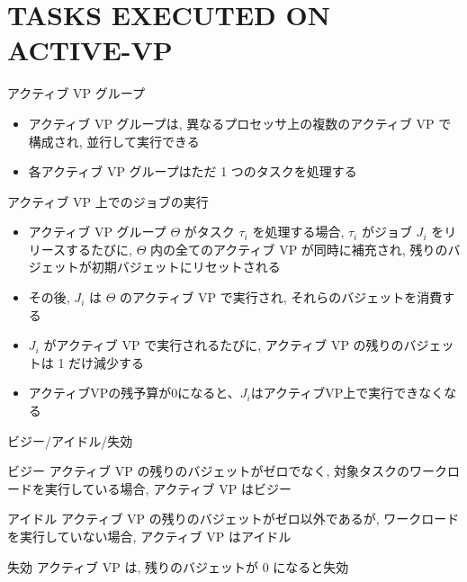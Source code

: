
\section{TASKS EXECUTED ON ACTIVE-VP}
\label{sec: tasks executed on active-vp}

\begin{frame}{アクティブ VP グループ}
    \begin{itemize}
        \item アクティブ VP グループは, 異なるプロセッサ上の複数のアクティブ VP で構成され, 並行して実行できる
        \item 各アクティブ VP グループはただ 1 つのタスクを処理する
    \end{itemize}
\end{frame}

\begin{frame}{アクティブ VP 上でのジョブの実行}
    \begin{itemize}
        \item アクティブ VP グループ $\Theta$ がタスク $\tau_{i}$ を処理する場合, $\tau_{i}$ がジョブ $J_{i}$ をリリースするたびに, $\Theta$ 内の全てのアクティブ VP が同時に補充され, 残りのバジェットが初期バジェットにリセットされる
        \item その後, $J_{i}$ は $\Theta$ のアクティブ VP で実行され, それらのバジェットを消費する
        \item $J_{i}$ がアクティブ VP で実行されるたびに, アクティブ VP の残りのバジェットは 1 だけ減少する
        \item アクティブVPの残予算が0になると、$J_{i}$はアクティブVP上で実行できなくなる
    \end{itemize}
\end{frame}

\begin{frame}{ビジー/アイドル/失効}
    \begin{block}{ビジー}
        アクティブ VP の残りのバジェットがゼロでなく, 対象タスクのワークロードを実行している場合, アクティブ VP はビジー
    \end{block}
    \begin{block}{アイドル}
        アクティブ VP の残りのバジェットがゼロ以外であるが, ワークロードを実行していない場合, アクティブ VP はアイドル
    \end{block}
    \begin{block}{失効}
        アクティブ VP は, 残りのバジェットが 0 になると失効
    \end{block}
\end{frame}


